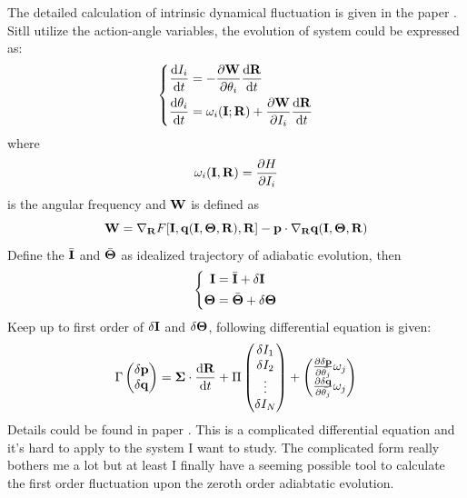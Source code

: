 \documentclass[fontsize=11pt, %
                             paper=a4, %
                             twoside, %
                             captions=tableheading,
                             index=totoc,
                             hyperref]{labbook}
\begin{document}
\begin{addmargin}[4cm]{0cm}
The detailed calculation of intrinsic dynamical fluctuation is given in the paper \cite{Zhang20121202}. Sitll utilize the action-angle variables, the evolution of system could be expressed as:
\begin{equation}
\left\{
\begin{aligned}
\frac{\mathrm{d} I_i}{\mathrm{d} t}&=-\frac{\partial \mathbf{W}}{\partial \theta_i}\frac{\mathrm{d} \mathbf{R}}{\mathrm{d} t}\\
\frac{\mathrm{d} \theta_i}{\mathrm{d} t}&=\omega_i(\mathbf{I};\mathbf{R})+\frac{\partial \mathbf{W}}{\partial I_i}\frac{\mathrm{d} \mathbf{R}}{\mathrm{d} t}
\end{aligned}
\right.
\end{equation}
where
\begin{equation}
\omega_i(\mathbf{I},\mathbf{R})=\frac{\partial H}{\partial I_i}
\end{equation}
is the angular frequency and $\mathbf{W}$ is defined as
\begin{equation}
\mathbf{W}=\nabla_{\mathbf{R}} F[\mathbf{I},\mathbf{q}(\mathbf{I},\mbox{\boldmath$ \Theta $},\mathbf{R}),\mathbf{R}]-\mathbf{p} \cdot \nabla_{\mathbf{R}}\mathbf{q}(\mathbf{I},\mbox{\boldmath$ \Theta $},\mathbf{R})
\end{equation}
Define the $\bar{\mathbf{I}}$ and $\bar{\mathbf{\Theta}}$ as idealized trajectory of adiabatic evolution, then
\begin{equation}
\left\{
\begin{aligned}
\mathbf{I}&=\bar{\mathbf{I}}+\delta \mathbf{I}\\
\mbox{\boldmath$ \Theta $}&=\bar{\mbox{\boldmath$ \Theta $}}+\delta \mathbf{\Theta}
\end{aligned}
\right.
\end{equation}
Keep up to first order of $\delta \mathbf{I}$ and $\delta \mathbf{\Theta}$, following differential equation is given:
\begin{equation}
\Gamma
\begin{pmatrix}
\delta \mathbf{p}\\
\delta \mathbf{q}
\end{pmatrix}
=
\mbox{\boldmath$ \Sigma $} \cdot \frac{\mathrm{d} \mathbf{R}}{\mathrm{d} t} + \Pi 
\begin{pmatrix}
\delta I_1\\
\delta I_2\\
\vdots\\
\delta I_N
\end{pmatrix}
+
\begin{pmatrix}
\frac{\partial \delta \mathbf{p}}{\partial \bar{\theta_j}}\omega_j\\
\frac{\partial \delta \mathbf{q}}{\partial \bar{\theta_j}}\omega_j
\end{pmatrix}
\end{equation}
Details could be found in paper \cite{Zhang20121202}. This is a complicated differential equation and it's hard to apply to the system I want to study. The complicated form really bothers me a lot but at least I finally have a seeming possible tool to calculate the first order fluctuation upon the zeroth order adiabtatic evolution.\\


\end{addmargin}
\end{document}

